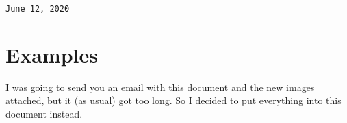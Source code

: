 \documentclass{article}
\theoremstyle{definition}
\begin{document}
\newpage







\texttt{June 12, 2020}









































\newpage

\section{Examples}
I was going to send you an email with this document and the new images attached, but it (as usual) got too long. So I decided to put everything into this document instead.  \\
\end{document}

